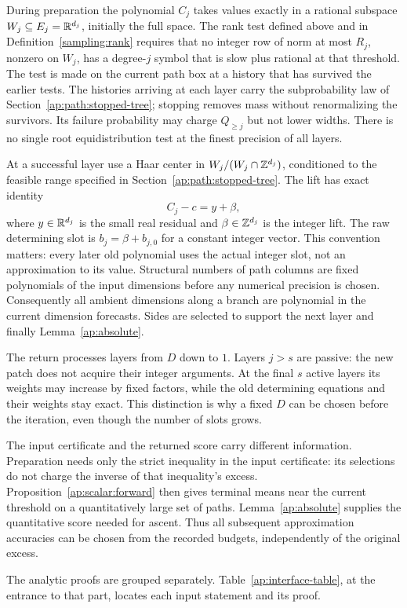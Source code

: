 

During preparation the polynomial $C_j$ takes values exactly in a
rational subspace $W_j\subseteq E_j=\mathbb R^{d_j}$, initially the full
space. The rank test defined above and in Definition~\ref{sampling:rank}
requires that no integer
row of norm at most $R_j$, nonzero on $W_j$, has a degree-$j$
symbol that is slow plus rational at that threshold. The test is made
on the current path box at a history that has survived the earlier
tests. The histories arriving at each layer carry the subprobability
law of Section~\ref{ap:path:stopped-tree}; stopping removes mass
without renormalizing the survivors.
Its failure probability may charge $Q_{\ge j}$ but not lower
widths. There is no single root equidistribution test at the finest
precision of all layers.

At a successful layer use a Haar center in
$W_j/(W_j\cap\mathbb Z^{d_j})$, conditioned to the feasible range
specified in Section~\ref{ap:path:stopped-tree}. The lift has exact identity
\[
                     C_j-c=y+\beta,
\]
where $y\in\mathbb R^{d_j}$ is the small real residual and
$\beta\in\mathbb Z^{d_j}$ is the integer lift. The raw determining
slot is $b_j=\beta+b_{j,0}$ for a constant
integer vector. This convention matters: every later old polynomial
uses the actual integer slot, not an approximation to its value.
Structural numbers of path columns are fixed polynomials of the
input dimensions before any numerical precision is chosen.
Consequently all ambient dimensions along a branch are polynomial
in the current dimension forecasts. Sides are selected to support
the next layer and finally Lemma~\ref{ap:absolute}.

The return processes layers from $D$ down to $1$. Layers $j>s$
are passive: the new patch does not acquire their integer arguments.
At the final $s$ active layers its weights may increase by fixed
factors, while the old determining equations and their weights stay
exact. This distinction is why a fixed $D$ can be chosen before the
iteration, even though the number of slots grows.

The input certificate and the returned score carry different information.
Preparation needs only
the strict inequality in the input certificate: its selections do not charge
the inverse of that inequality's excess. Proposition~\ref{ap:scalar:forward}
then gives terminal means near the current threshold on a quantitatively
large set of paths. Lemma~\ref{ap:absolute} supplies the quantitative score
needed for ascent. Thus all subsequent approximation accuracies can be
chosen from the recorded budgets, independently of the original excess.

The analytic proofs are grouped separately.
Table~\ref{ap:interface-table}, at the entrance to that part,
locates each input statement and its proof.
